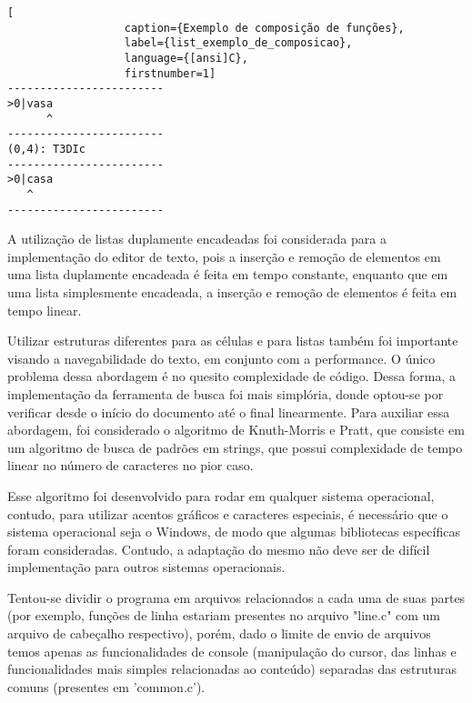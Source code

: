 \documentclass[a4paper, 11pt]{article}
\begin{document}
\begin{center}
      \begin{minipage}{0.45\linewidth}
            \begin{lstlisting}[
                  caption={Exemplo de composição de funções}, 
                  label={list_exemplo_de_composicao}, 
                  language={[ansi]C},
                  firstnumber=1]
------------------------
>0|vasa
      ^
------------------------
(0,4): T3DIc
------------------------
>0|casa
   ^
------------------------
            \end{lstlisting}
      \end{minipage}
\end{center}

A utilização de listas duplamente encadeadas foi considerada para a implementação do editor de texto, pois a inserção e remoção de elementos em uma lista duplamente encadeada é feita em tempo constante, enquanto que em uma lista simplesmente encadeada, a inserção e remoção de elementos é feita em tempo linear. 

Utilizar estruturas diferentes para as células e para listas também foi importante visando a navegabilidade do texto, em conjunto com a performance. O único problema dessa abordagem é no quesito complexidade de código. Dessa forma, a implementação da ferramenta de busca foi mais simplória, donde optou-se por verificar desde o início do documento até o final linearmente. Para auxiliar essa abordagem, foi considerado o algoritmo de Knuth-Morris e Pratt, que consiste em um algoritmo de busca de padrões em strings, que possui complexidade de tempo linear no número de caracteres no pior caso.

Esse algoritmo foi desenvolvido para rodar em qualquer sistema operacional, contudo, para utilizar acentos gráficos e caracteres especiais, é necessário que o sistema operacional seja o Windows, de modo que algumas bibliotecas específicas foram consideradas. Contudo, a adaptação do mesmo não deve ser de difícil implementação para outros sistemas operacionais.

Tentou-se dividir o programa em arquivos relacionados a cada uma de suas partes (por exemplo, funções de linha estariam presentes no arquivo "line.c" com um arquivo de cabeçalho respectivo), porém, dado o limite de envio de arquivos temos apenas as funcionalidades de console (manipulação do cursor, das linhas e funcionalidades mais simples relacionadas ao conteúdo) separadas das estruturas comuns (presentes em 'common.c').
\end{document}
